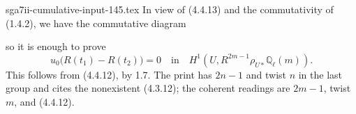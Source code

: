 \begin{filecontents*}{sga7ii-cumulative-input-145.tex}
In view of (4.4.13) and the commutativity of (1.4.2), we have the
commutative diagram
\begin{center}
\end{center}
so it is enough to prove
\begin{equation*}
u_0\bigl(R(t_1)-R(t_2)\bigr)=0
\quad\text{in}\quad
H^1(U,R^{2m-1}\rho_{U*}\mathbb Q_\ell(m)).
\end{equation*}
This follows from (4.4.12), by 1.7.  The print has $2n-1$ and twist
$n$ in the last group and cites the nonexistent (4.3.12); the coherent
readings are $2m-1$, twist $m$, and (4.4.12).
\end{filecontents*}
